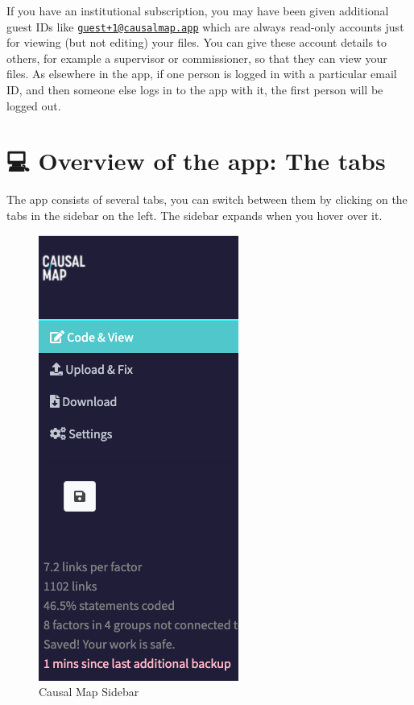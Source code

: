 \documentclass[
]{book}
\begin{document}
If you have an institutional subscription, you may have been given additional guest IDs like \href{mailto:guest+1@causalmap.app}{\nolinkurl{guest+1@causalmap.app}} which are always read-only accounts just for viewing (but not editing) your files. You can give these account details to others, for example a supervisor or commissioner, so that they can view your files. As elsewhere in the app, if one person is logged in with a particular email ID, and then someone else logs in to the app with it, the first person will be logged out.

\hypertarget{overview-of-the-app-the-tabs}{%
\section{💻 Overview of the app: The tabs}\label{overview-of-the-app-the-tabs}}

The app consists of several tabs, you can switch between them by clicking on the tabs in the sidebar on the left. The sidebar expands when you hover over it.

\begin{figure}
\centering
\includegraphics{_assets/sidebar1.png}
\caption{Causal Map Sidebar}
\end{figure}
\end{document}
